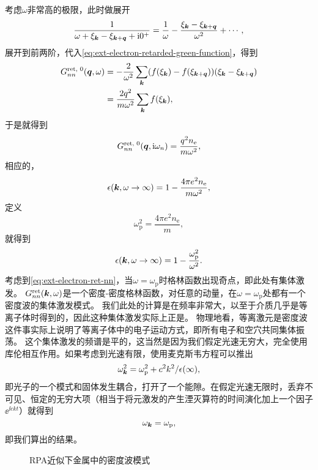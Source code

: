 考虑$\omega$非常高的极限，此时做展开
\[
    \frac{1}{\omega + \xi_{\vb*{k}} - \xi_{\vb*{k} + \vb*{q}} + \mathrm{i} 0^+} = \frac{1}{\omega} - \frac{\xi_{\vb*{k}} - \xi_{\vb*{k} + \vb*{q}}}{\omega^2} + \cdots,
\]
展开到前两阶，代入\eqref{eq:ext-electron-retarded-green-function}，得到
\[
    \begin{aligned}
        G_{nn}^\text{ret, 0}(\vb*{q}, \omega) &= - \frac{2}{\omega^2} \sum_{\vb*{k}} (f(\xi_{\vb*{k}}) - f(\xi_{\vb*{k} + \vb*{q}})) (\xi_{\vb*{k}} - \xi_{\vb*{k} + \vb*{q}}) \\
        &= \frac{2 q^2}{m \omega^2} \sum_{\vb*{k}} f(\xi_{\vb*{k}}), 
    \end{aligned}
\]
于是就得到
\begin{equation}
    G_{nn}^\text{ret, 0}(\vb*{q}, \mathrm{i} \omega_n) = \frac{q^2 n_\text{e}}{m \omega^2},
\end{equation}
相应的，
\[
    \epsilon(\vb*{k}, \omega \to \infty) = 1 - \frac{4 \pi e^2 n_\text{e}}{m \omega^2},
\]
定义
\begin{equation}
    \omega_\text{p}^2 = \frac{4 \pi e^2 n_\text{e}}{m},
    \label{eq:omega-p-def-rpa}
\end{equation}
就得到
\begin{equation}
    \epsilon(\vb*{k}, \omega \to \infty) = 1 - \frac{\omega_\text{p}^2}{\omega^2}.
    \label{eq:rpa-omega-infty-response}
\end{equation}
考虑到\eqref{eq:ext-electron-ret-nn}，当$\omega = \omega_\text{p}$时格林函数出现奇点，即此处有集体激发。
$G^\text{ret}_{nn}(\vb*{k}, \omega)$是一个密度-密度格林函数，对任意的动量，在$\omega = \omega_\text{p}$处都有一个密度波的集体激发模式。
我们此处的计算是在频率非常大，以至于介质几乎是等离子体时得到的，因此这种集体激发实际上正是。
物理地看，等离激元是密度波这件事实际上说明了等离子体中的电子运动方式，即所有电子和空穴共同集体振荡。
这个集体激发的频谱是平的，这当然是因为我们假定光速无穷大，完全使用库伦相互作用。如果考虑到光速有限，使用麦克斯韦方程可以推出
\begin{equation}
    \omega_{\vb*{k}}^2 = \omega_\text{p}^2 + c^2 k^2 / \epsilon(\infty),
\end{equation}
即光子的一个模式和固体发生耦合，打开了一个能隙。在假定光速无限时，丢弃不可见、恒定的无穷大项（相当于将元激发的产生湮灭算符的时间演化加上一个因子$\ee^{\ii c k t}$）就得到
\[
    \omega_{\vb*{k}} = \omega_\text{p},
\]
即我们算出的结果。

\begin{figure}
    \centering
    
    \caption{RPA近似下金属中的密度波模式}
    \label{fig:rpa-density-modes}
\end{figure}

